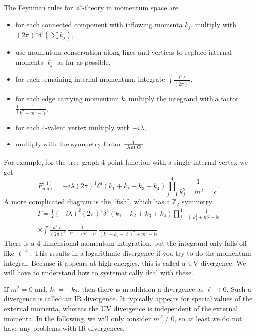 \begin{definition}
  The Feynman rules for $\phi^4$-theory in momentum space are
  \begin{itemize}
  \item for each connected component with inflowing momenta $k_j$,
    multiply with $(2\pi)^4 \delta^4(\sum k_j)$,
  \item use momentum conservation along lines and vertices to replace
    internal momenta $\ell_j$ as far as possible,
  \item for each remaining internal momentum, integrate $\int
    \frac{d^4\ell}{(2\pi)^4}$,
  \item
    for each edge carrying momentum $k$, multiply the integrand with a factor
    $\frac{1}{i} \frac{1}{k^2+m^2-i \epsilon}$,
  \item for each 4-valent vertex multiply with $-i\lambda$,
  \item multiply with the symmetry factor $\frac{1}{|\operatorname{Aut} G|}$.
  \end{itemize}
\end{definition}
For example, for the tree graph $4$-point function with a single
internal vertex we get
\begin{equation}
  F^{(1)}_\text{conn} = 
  -i \lambda (2\pi)^4 \delta^4(k_1+k_2+k_3+k_4) \prod_{j=1}^4
  \frac{1}{k_j^2+m^2-i \epsilon}. 
\end{equation}
A more complicated diagram is the ``fish'', which has a $\mathbb{Z}_2$
symmetry:
\begin{multline}
  F = 
  \frac{1}{2}
  (-i\lambda)^2
  (2\pi)^4 \delta^4(k_1+k_2+k_3+k_4) 
  \prod_{j=1}^4 \frac{1}{k_j^2+m^2-i \epsilon}
  \\
  \times
  \int \frac{d^4\ell}{(2\pi)^4}~
  \frac{1}{\ell^2 + m^2 -i\epsilon}~
  \frac{1}{(k_1+k_2-\ell)^2 + m^2 -i\epsilon}
\end{multline}
There is a $4$-dimensional momentum integration, but the integrand
only falls off like $\ell^{-4}$. This results in a logarithmic
divergence if you try to do the momentum integral. Because it appears
at high energies, this is called a UV divergence. We will have to
understand how to systematically deal with these.

If $m^2=0$ and, $k_1=-k_2$, then there is in addition a divergence as
$\ell\to 0$. Such a divergence is called an IR divergence. It
typically appears for special values of the external momenta, whereas
the UV divergence is independent of the external momenta. In the
following, we will only consider $m^2\not=0$, so at least we do not
have any problems with IR divergences.



